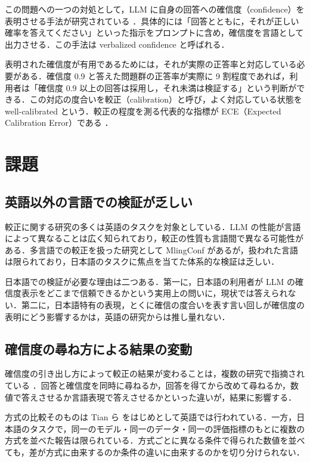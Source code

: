 この問題への一つの対処として，LLM に自身の回答への確信度（confidence）を表明させる手法が研究されている \cite{kadavath2022know,lin2022teaching,tian2023justask}．具体的には「回答とともに，それが正しい確率を答えてください」といった指示をプロンプトに含め，確信度を言語として出力させる．この手法は verbalized confidence と呼ばれる．

表明された確信度が有用であるためには，それが実際の正答率と対応している必要がある．確信度 0.9 と答えた問題群の正答率が実際に 9 割程度であれば，利用者は「確信度 0.9 以上の回答は採用し，それ未満は検証する」という判断ができる．この対応の度合いを較正（calibration）と呼び，よく対応している状態をwell-calibrated という．較正の程度を測る代表的な指標が ECE（Expected Calibration Error）である \cite{guo2017calibration}．

\section{課題}

\subsection{英語以外の言語での検証が乏しい}

較正に関する研究の多くは英語のタスクを対象としている．LLM の性能が言語によって異なることは広く知られており，較正の性質も言語間で異なる可能性がある．多言語での較正を扱った研究として MlingConf \cite{xue2025mlingconf} があるが，扱われた言語は限られており，日本語のタスクに焦点を当てた体系的な検証は乏しい．

日本語での検証が必要な理由は二つある．第一に，日本語の利用者が LLM の確信度表示をどこまで信頼できるかという実用上の問いに，現状では答えられない．第二に，日本語特有の表現，とくに確信の度合いを表す言い回しが確信度の表明にどう影響するかは，英語の研究からは推し量れない．

\subsection{確信度の尋ね方による結果の変動}

確信度の引き出し方によって較正の結果が変わることは，複数の研究で指摘されている \cite{tian2023justask,xiong2024llmuncertainty}．回答と確信度を同時に尋ねるか，回答を得てから改めて尋ねるか，数値で答えさせるか言語表現で答えさせるかといった違いが，結果に影響する．

方式の比較そのものは Tian ら \cite{tian2023justask} をはじめとして英語では行われている．一方，日本語のタスクで，同一のモデル・同一のデータ・同一の評価指標のもとに複数の方式を並べた報告は限られている．方式ごとに異なる条件で得られた数値を並べても，差が方式に由来するのか条件の違いに由来するのかを切り分けられない．

